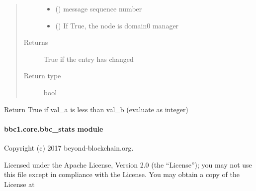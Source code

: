 \documentclass[letterpaper,10pt,english]{sphinxmanual}
\begin{document}
\begin{fulllineitems}
\begin{fulllineitems}
\begin{quote}
\begin{description}
\begin{itemize}
\item {} 
 () \textendash{} message sequence number

\item {} 
 () \textendash{} If True, the node is domain0 manager

\end{itemize}

\item[{Returns}] \leavevmode
True if the entry has changed

\item[{Return type}] \leavevmode
bool

\end{description}\end{quote}

\end{fulllineitems}


\end{fulllineitems}


\begin{fulllineitems}
\label{\detokenize{bbc1.core.bbc_network:bbc1.core.bbc_network.is_less_than}}
Return True if val\_a is less than val\_b (evaluate as integer)

\end{fulllineitems}



\paragraph{bbc1.core.bbc\_stats module}
\label{\detokenize{bbc1.core.bbc_stats::doc}}\label{\detokenize{bbc1.core.bbc_stats:module-bbc1.core.bbc_stats}}\label{\detokenize{bbc1.core.bbc_stats:bbc1-core-bbc-stats-module}}
Copyright (c) 2017 beyond-blockchain.org.

Licensed under the Apache License, Version 2.0 (the “License”);
you may not use this file except in compliance with the License.
You may obtain a copy of the License at
\begin{quote}

\end{quote}
\end{document}
